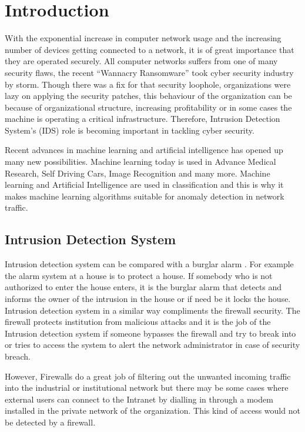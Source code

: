 \documentclass[12pt, a4paper]{report}
\begin{document}
\chapter{Introduction}\label{sec:intro}
\justify
With the exponential increase in computer network usage and the increasing number of devices getting connected to a network, it is of great importance that they are operated securely. All computer networks suffers from one of many security flaws, the recent ``Wannacry Ransomware'' took cyber security industry by storm. Though there was a fix for that security loophole, organizations were lazy on applying the security patches, this behaviour of the organization can be because of organizational structure, increasing profitability or in some cases the machine is operating a critical infrastructure. Therefore, Intrusion Detection System's (IDS) role is becoming important in tackling cyber security.\\ \par

Recent advances in machine learning and artificial intelligence has opened up many new possibilities. Machine learning today is used in Advance Medical Research, Self Driving Cars, Image Recognition and many more. Machine learning and Artificial Intelligence are used in classification and this is why it makes machine learning algorithms suitable for anomaly detection in network traffic. \\

\section{Intrusion Detection System}\label{sec:introintrusion}

\justify
Intrusion detection system can be compared with a burglar alarm \cite{IDS}. For example the alarm system at a house is to protect a house. If somebody who is not authorized to enter the house enters, it is the burglar alarm that detects and informs the owner of the intrusion in the house or if need be it locks the house. Intrusion detection system in a similar way compliments the firewall security. The firewall protects institution from malicious attacks and it is the job of the Intrusion detection system if someone bypasses the firewall and try to break into or tries to access the system  to alert the network administrator in case of security breach.\\ \par

However, Firewalls do a great job of filtering out the unwanted incoming traffic into the industrial or institutional network but there may be some cases where external users can connect to the Intranet by dialling in through a modem installed in the private network of the organization. This kind of access would not be detected by a firewall.\cite{IDS}
\end{document}
